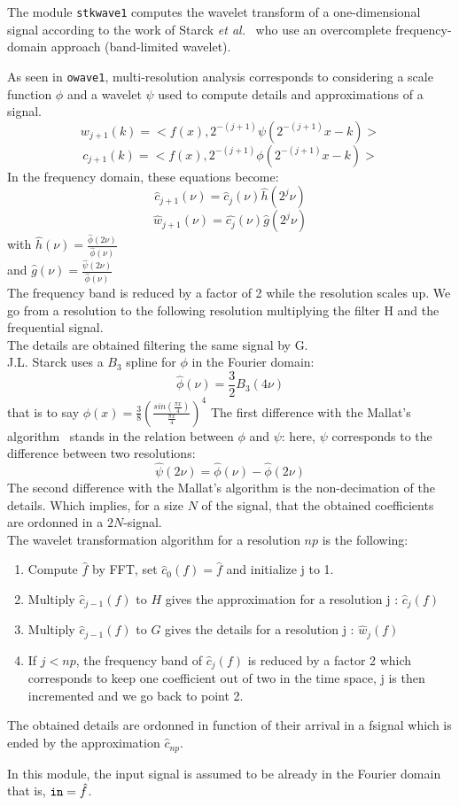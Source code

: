 The module {\tt stkwave1} computes the wavelet transform of a one-dimensional signal according to the work
of Starck {\em et al.}~\cite{starck.bijaoui.ea:image} who use an overcomplete frequency-domain approach (band-limited wavelet).

As seen in {\tt owave1}, multi-resolution analysis corresponds to considering a scale function $\phi$ and a wavelet $\psi$ used to compute details and approximations of a signal.
$$w_{j+1}(k)=<f(x),2^{-(j+1)}\psi(2^{-(j+1)}x-k)> $$
$$c_{j+1}(k)=<f(x),2^{-(j+1)}\phi(2^{-(j+1)}x-k)> $$
In the frequency domain, these equations become:
$$\hat{c}_{j+1}(\nu)=\hat{c}_{j}(\nu)\hat{h}(2^j\nu) $$
$$\hat{w}_{j+1}(\nu)=\hat{c_j}(\nu)\hat{g}(2^j\nu) $$
with $\hat{h}(\nu)=\frac{\hat{\phi}(2\nu)}{\hat{\phi}(\nu)}$\\
and $\hat{g}(\nu)=\frac{\hat{\psi}(2\nu)}{\hat{\phi}(\nu)}$\\
The frequency band is reduced by a factor of 2 while the resolution scales up.
We go from a resolution to the following resolution multiplying the filter H and the frequential signal. \\
The details are obtained filtering the same signal by G.\\
J.L. Starck uses a $B_3$ spline for $\phi$ in the Fourier domain:
$$\hat{\phi}(\nu)=\frac{3}{2}B_3(4\nu)$$
that is to say $\phi(x)=\frac{3}{8}(\frac{sin(\frac{\pi x}{4})}{\frac{\pi x}{4}})^4$
The first difference with the Mallat's algorithm~\cite{mallat:theory} stands in the relation between $\phi$ and $\psi$: here, $\psi$ corresponds to the difference between two resolutions:
$$\hat{\psi}(2\nu)=\hat{\phi}(\nu)-\hat{\phi}(2\nu)$$
The second difference with the Mallat's algorithm is the non-decimation of the details. Which implies, for a size $N$ of the signal, that the obtained coefficients are ordonned in a $2N$-signal.\\
The wavelet transformation algorithm for a resolution $np$ is the following:\\
\begin{enumerate}
\item Compute $\hat{f}$ by FFT, set $\hat{c}_0(f)=\hat{f}$ and initialize j to 1.
\item Multiply $\hat{c}_{j-1}(f)$ to $H$ gives the approximation for a resolution j : $\hat{c}_j(f)$
\item Multiply $\hat{c}_{j-1}(f)$ to $G$ gives the details for a resolution j : $\hat{w}_j(f)$
\item If $j<np$, the frequency band of $\hat{c}_j(f)$ is reduced by a factor 2 which corresponds to keep one coefficient out of two in the time space, j is then incremented and we go back to point 2.
\end{enumerate}
The obtained details are ordonned in function of their arrival in a fsignal which is ended by the approximation $\hat{c}_{np} $.

In this module, the input signal is assumed to be already in the Fourier domain that is,
${\tt in} = \hat{f}$.
